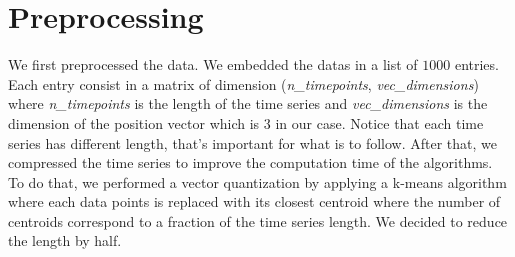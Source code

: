 \section{Preprocessing}

We first preprocessed the data. We embedded the datas in a list of $1000$ entries. Each entry consist in a matrix of dimension (\textit{n\_timepoints}, \textit{vec\_dimensions}) where \textit{n\_timepoints} is the length of the time series and \textit{vec\_dimensions} is the dimension of the position vector which is $3$ in our case. Notice that each time series has different length, that's important for what is to follow. After that, we compressed the time series to improve the computation time of the algorithms. To do that, we performed a vector quantization by applying a k-means algorithm where each data points is replaced with its closest centroid where the number of centroids correspond to a fraction of the time series length. We decided to reduce the length by half.